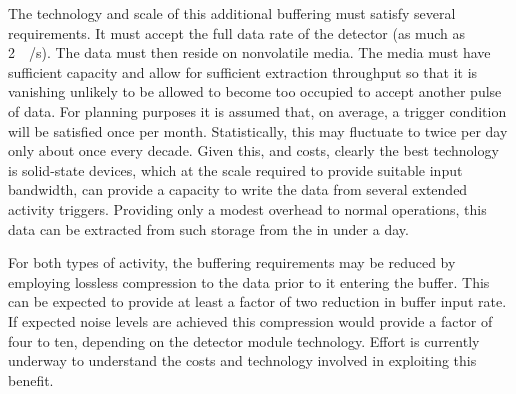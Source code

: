The technology and scale of this additional buffering must satisfy several requirements. 
It must accept the full data rate of the detector (as much as \SI{2}{\tera\byte/\second}). 
The data must then reside on nonvolatile media. 
The media must have sufficient capacity and allow for sufficient extraction throughput so that it is vanishing unlikely to be allowed to become too occupied to accept another pulse of data. 
For planning purposes it is assumed that, on average, a  trigger condition will be satisfied once per month. 
Statistically, this may fluctuate to twice per day only about once every decade.
Given this, and costs, clearly the  best technology is %
solid-state devices, which at the scale required to provide suitable input bandwidth, can provide a capacity to write the data from several extended activity triggers.
Providing only a modest overhead to normal operations, this data can be extracted from such storage from the  in under a day.

For both types of activity, the buffering requirements may be reduced by employing lossless compression to the data prior to it entering the buffer.
This can be expected to provide at least a factor of two reduction in buffer input rate. 
If expected noise levels are achieved this compression would provide a factor of four to ten, depending on the detector module technology.
Effort is currently underway to understand the costs and technology involved in exploiting this benefit.




